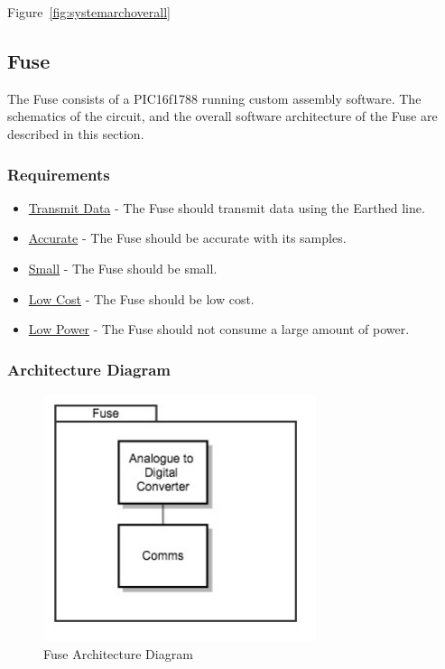 \documentclass[preprint,12pt,3p]{elsarticle}
\begin{document}
Figure~\ref{fig:systemarchoverall}








\subsection{Fuse}
The Fuse consists of a PIC16f1788 running custom assembly software. The schematics of the circuit, and the overall software architecture of the Fuse are described in this section.

\subsubsection{Requirements}
\begin{itemize}
\item \underline{Transmit Data} - The Fuse should transmit data using the Earthed line.
\item \underline{Accurate} - The Fuse should be accurate with its samples.
\item \underline{Small} - The Fuse should be small.
\item \underline{Low Cost} - The Fuse should be low cost.
\item \underline{Low Power} - The Fuse should not consume a large amount of power.
\end{itemize}

\subsubsection{Architecture Diagram}

\begin{figure}[H]
    \centering
    \includegraphics[width=8cm]{diagrams/fuse}
    \caption {Fuse Architecture Diagram}
\end{figure}
\end{document}
